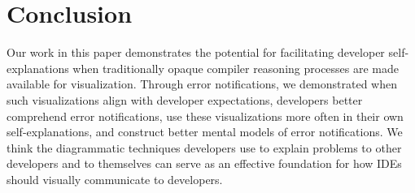 \documentclass[conference]{IEEEtran}
\begin{document}


\section{Conclusion}

Our work in this paper demonstrates the potential for facilitating developer self-explanations when traditionally opaque compiler reasoning processes are made available for visualization. Through error notifications, we demonstrated when such visualizations align with developer expectations, developers better comprehend error notifications, use these visualizations more often in their own self-explanations, and construct better mental models of error notifications. We think the diagrammatic techniques developers use to explain problems to other developers and to themselves can serve as an effective foundation for how IDEs should visually communicate to developers.





\end{document}
